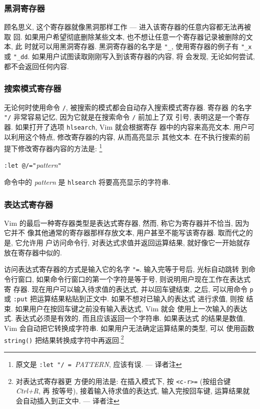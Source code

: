 \subsubsection{黑洞寄存器}
\label{subsubsec:the_black_hole_register}

顾名思义, 这个寄存器就像黑洞那样工作 --- 进入该寄存器的任意内容都无法再被取
回. 如果用户希望彻底删除某些文本, 也不想让任意一个寄存器记录被删除的文本, 此
时就可以用黑洞寄存器. 黑洞寄存器的名字是 \texttt{"\_}, 使用寄存器的例子有
\texttt{"\_x} 或 \texttt{"\_dd}. 如果用户试图读取刚刚写入到该寄存器的内容, 将
会发现, 无论如何尝试, 都不会返回任何内容.

\subsubsection{搜索模式寄存器}
\label{subsubsec:search_pattern_register}

无论何时使用命令 \texttt{/}, 被搜索的模式都会自动存入搜索模式寄存器. 寄存器
的名字 \texttt{"/} 非常容易记忆, 因为它就是在搜索命令 \texttt{/} 前加上了双
引号, 表明这是一个寄存器. 如果打开了选项 \texttt{hlsearch}, Vim 就会根据寄存
器中的内容来高亮文本. 用户可以利用这个特点, 修改寄存器的内容, 从而高亮显示
其他文本. 在不执行搜索的前提下修改寄存器内容的方法是:
\footnote{原文是 \texttt{:let "/ = }\textit{PATTERN}, 应该有误. --- 译者注}
\begin{vimcmdform}
    \texttt{:let @/="}\textit{pattern}\texttt{"}
\end{vimcmdform}
命令中的 \textit{pattern} 是 \texttt{hlsearch} 将要高亮显示的字符串.

\subsubsection{表达式寄存器}
\label{subsubsec:the_expression_register}

Vim 的最后一种寄存器类型是表达式寄存器, 然而, 称它为寄存器并不恰当, 因为它并不
像其他通常的寄存器那样存放文本, 用户甚至不能写该寄存器. 取而代之的是, 它允许用
户访问命令行, 对表达式求值并返回运算结果, 就好像它一开始就存放在寄存器中似的.

访问表达式寄存器的方式是输入它的名字 \texttt{"=}. 输入完等于号后, 光标自动跳转
到命令行窗口, 如果命令行窗口的第一个字符是等于号, 则说明用户现在工作在表达式寄
存器. 现在用户可以输入待求值的表达式, 并以回车键结束, 之后, 可以用命令
\texttt{p} 或 \texttt{:put} 把运算结果粘贴到正文中. 如果不想对已输入的表达式
进行求值, 则按  结束. 如果用户在按回车键之前没有输入表达式, Vim 就会
使用上一次输入的表达式. 表达式必须是有效的, 而且应该返回一个字符串. 如果表达式
的结果是数值, Vim 会自动把它转换成字符串. 如果用户无法确定运算结果的类型, 可以
使用函数 \texttt{string()} 把结果转换成字符中再返回.\footnote{对表达式寄存器更
方便的用法是: 在插入模式下, 按 \texttt{<c-r>=} (按组合键 \textit{Ctrl+R}, 再
按等号), 接着输入待求值的表达式, 输入完按回车键, 运算结果就会自动插入到正文中.
--- 译者注}

